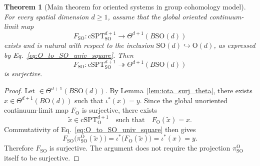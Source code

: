 \documentclass[aps,prx,reprint,superscriptaddress,twocolumn,amsmath,amssymb,amsfonts, nofootinbib]{revtex4-2}
\newcommand{\SO}{\text{SO}}
\theoremstyle{apsstyle}
\newtheorem{theorem}{Theorem}[section]
\begin{document}
\bigskip 

\begin{theorem}[Main theorem for oriented systems in group cohomology model]
\label{theorem:main_SO}
For every spatial dimension $d\geq1$, assume that the global oriented continuum-limit map
\begin{equation*}
    F_{\mathrm{SO}}:
    \mathrm{cSPT}^{d+1}_{\mathrm{SO}}
    \longrightarrow
    \Theta^{d+1}(B\SO(d))
\end{equation*}
exists and is natural with respect to the inclusion
$\SO(d)\hookrightarrow\mathrm O(d)$, as expressed by
Eq.~\eqref{eq:O_to_SO_univ_square}. Then
\begin{equation}
    F_{\mathrm{SO}}:
    \mathrm{cSPT}^{d+1}_{\mathrm{SO}}
    \twoheadrightarrow
    \Theta^{d+1}(B\SO(d))
    \label{eq:maintheorem_SO}
\end{equation}
is surjective.
\end{theorem}

\begin{proof}
Let $\in\Theta^{d+1}(B\SO(d))$. By Lemma~\ref{lem:iota_surj_theta}, there exists $x\in\Theta^{d+1}(B\mathrm O(d))$ such that $\iota^*(x)=y$. Since the global unoriented continuum-limit map $F_{\mathrm O}$ is surjective, there exists
\begin{equation*}
    \widetilde x\in\mathrm{cSPT}^{d+1}_{\mathrm O}\quad \text{such that}\quad 
    F_{\mathrm O}(\widetilde x)=x.
\end{equation*}
Commutativity of Eq.~\eqref{eq:O_to_SO_univ_square} then gives
\begin{equation*}
    F_{\mathrm{SO}} \bigl(
        \pi^{\mathrm O}_{\mathrm{SO}}(\widetilde x)\bigr)
    = \iota^*\bigl(F_{\mathrm O}(\widetilde x)\bigr) = \iota^*(x) = y.
\end{equation*}
Therefore $F_{\mathrm{SO}}$ is surjective. The argument does not require the projection $\pi^{\mathrm O}_{\mathrm{SO}}$ itself to be surjective.
\end{proof}
\end{document}

